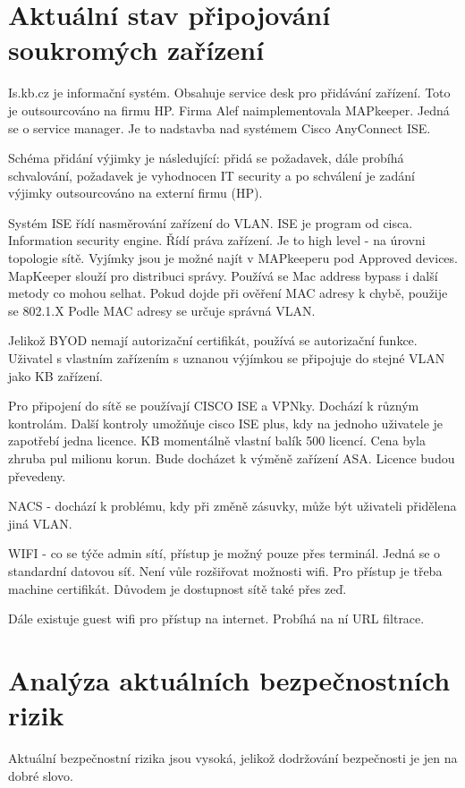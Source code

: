 

\section{Aktuální stav připojování soukromých zařízení}

Is.kb.cz je informační systém. Obsahuje service desk pro přidávání zařízení. Toto je outsourcováno na firmu HP. Firma Alef naimplementovala MAPkeeper. Jedná se o service manager. Je to nadstavba nad systémem Cisco AnyConnect ISE.


Schéma přidání výjimky je následující: přidá se požadavek, dále probíhá schvalování, požadavek je vyhodnocen IT security a po schválení je zadání výjimky outsourcováno na externí firmu (HP).

Systém ISE řídí nasměrování zařízení do VLAN. ISE je program od cisca. Information security engine. Řídí práva zařízení. Je to high level - na úrovni topologie sítě. Vyjímky jsou je možné najít v MAPkeeperu pod Approved devices. MapKeeper slouží pro distribuci správy. Používá se Mac address bypass i další metody co mohou selhat. Pokud dojde při ověření MAC adresy k chybě, použije se  802.1.X  Podle MAC adresy se určuje správná VLAN.

Jelikož BYOD nemají autorizační certifikát, používá se autorizační funkce. Uživatel s vlastním zařízením s uznanou výjímkou se připojuje do stejné VLAN jako KB zařízení.


Pro připojení do sítě se používají CISCO ISE a VPNky. Dochází k různým kontrolám.
Další kontroly umožňuje cisco ISE plus, kdy na jednoho uživatele je zapotřebí jedna licence. KB momentálně vlastní balík 500 licencí. Cena byla zhruba pul milionu korun. Bude docházet k výměně zařízení ASA. Licence budou převedeny.


NACS - dochází k problému, kdy při změně zásuvky, může být uživateli přidělena jiná VLAN.


WIFI - co se týče admin sítí, přístup je možný pouze přes terminál. Jedná se o standardní datovou síť. Není vůle rozšiřovat možnosti wifi. Pro přístup je třeba machine certifikát. Důvodem je dostupnost sítě také přes zeď.

Dále existuje guest wifi pro přístup na internet. Probíhá na ní URL filtrace.


\section{Analýza aktuálních bezpečnostních rizik}
Aktuální bezpečnostní rizika jsou vysoká, jelikož dodržování bezpečnosti je jen na dobré slovo. 

